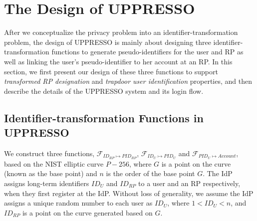\section{The Design of UPPRESSO}
\label{sec:UPPRESSO}

After we conceptualize the privacy problem into an identifier-transformation problem, the design of UPPRESSO is mainly about designing three identifier-transformation functions to generate pseudo-identifiers for the user and RP as well as linking the user's pseudo-identifier to her account at an RP. In this section, we first present our design of these three functions to support {\em transformed RP designation} and {\em trapdoor user identification} properties, and then describe the details of the UPPRESSO system and its login flow.


\subsection{Identifier-transformation Functions in UPPRESSO}
\label{subsec:overview}


We construct three functions, $\mathcal{F}_{ID_{RP} \mapsto PID_{RP}}$, $\mathcal{F}_{ID_{U} \mapsto PID_{U}}$ and $\mathcal{F}_{PID_{U} \mapsto Account}$, based on the NIST elliptic curve $P-256$, 
where 
$G$ is a point on the curve (known as the base point) 
and $n$ is the order of the base point $G$. %
The IdP assigns long-term identifiers $ID_U$ and $ID_{RP}$ to a user and an RP respectively, when they first register at the IdP. Without loss of generality, we assume the IdP assigns a unique random number to each user as $ID_U$, where $1<ID_U<n$, and $ID_{RP}$ is a point on the curve generated based on $G$.%

